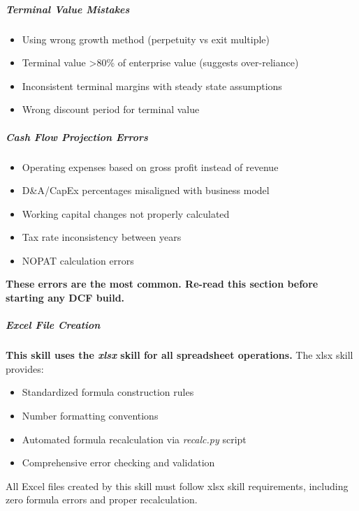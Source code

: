 \documentclass[11pt]{article}
\begin{document}
\subparagraph{Terminal Value Mistakes}\mbox{}\par
\begin{itemize}[leftmargin=*,itemsep=2pt,topsep=2pt]
\item {} Using wrong growth method (perpetuity vs exit multiple)
\item {} Terminal value >80\% of enterprise value (suggests over-reliance)
\item {} Inconsistent terminal margins with steady state assumptions
\item {} Wrong discount period for terminal value
\end{itemize}

\subparagraph{Cash Flow Projection Errors}\mbox{}\par
\begin{itemize}[leftmargin=*,itemsep=2pt,topsep=2pt]
\item {} Operating expenses based on gross profit instead of revenue
\item {} D\&A/CapEx percentages misaligned with business model
\item {} Working capital changes not properly calculated
\item {} Tax rate inconsistency between years
\item {} NOPAT calculation errors
\end{itemize}

\textbf{These errors are the most common. Re-read this section before starting any DCF build.}





\subparagraph{Excel File Creation}\mbox{}\par

\textbf{This skill uses the \emph{xlsx} skill for all spreadsheet operations.} The xlsx skill provides:

\begin{itemize}[leftmargin=*,itemsep=2pt,topsep=2pt]
\item {} Standardized formula construction rules
\item {} Number formatting conventions
\item {} Automated formula recalculation via \emph{recalc.py} script
\item {} Comprehensive error checking and validation
\end{itemize}

All Excel files created by this skill must follow xlsx skill requirements, including zero formula errors and proper recalculation.
\end{document}
